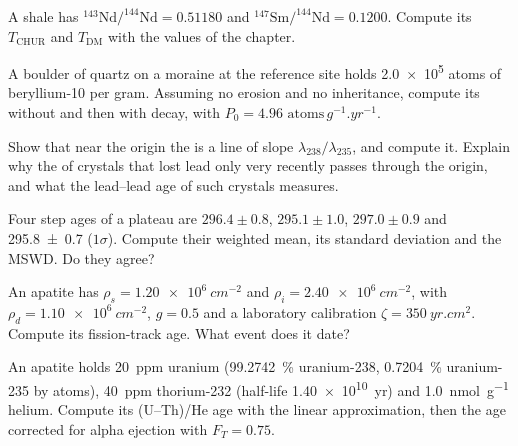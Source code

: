 \begin{exercise}[$\star$]\label{exo:b3:advanced-geochronology:3}
A shale has $^{143}\mathrm{Nd}/^{144}\mathrm{Nd} = 0.51180$ and
$^{147}\mathrm{Sm}/^{144}\mathrm{Nd} = 0.1200$. Compute its $T_{\mathrm{CHUR}}$
and $T_{\mathrm{DM}}$ with the values of the chapter.
\end{exercise}

\begin{exercise}[$\star$]\label{exo:b3:advanced-geochronology:4}
A boulder of quartz on a moraine at the reference site holds \num{2.0e5}
atoms of beryllium-10 per gram. Assuming no erosion and no inheritance,
compute its  without and then with decay, with $P_0 =
\num{4.96}\text{ atoms}\,\unit{g^{-1}.yr^{-1}}$.
\end{exercise}

\begin{exercise}[$\star\star$]\label{exo:b3:advanced-geochronology:5}
Show that near the origin the  is a line of slope
$\lambda_{238}/\lambda_{235}$, and compute it. Explain why the  of
crystals that lost lead only very recently passes through the origin, and
what the lead--lead age of such crystals measures.
\end{exercise}

\begin{exercise}[$\star\star$]\label{exo:b3:advanced-geochronology:6}
Four step ages of a plateau are $296.4 \pm 0.8$, $295.1 \pm 1.0$, $297.0 \pm
0.9$ and \qty[separate-uncertainty=true]{295.8 \pm 0.7}{\Ma} ($1\sigma$). Compute their weighted mean,
its standard deviation and the MSWD. Do they agree?
\end{exercise}

\begin{exercise}[$\star\star$]\label{exo:b3:advanced-geochronology:7}
An apatite has $\rho_s = \qty{1.20e6}{cm^{-2}}$ and $\rho_i =
\qty{2.40e6}{cm^{-2}}$, with $\rho_d = \qty{1.10e6}{cm^{-2}}$, $g = 0.5$ and a
laboratory calibration $\zeta = \qty{350}{yr.cm^2}$. Compute its fission-track
age. What event does it date?
\end{exercise}

\begin{exercise}[$\star\star$]\label{exo:b3:advanced-geochronology:8}
An apatite holds \qty{20}{ppm} uranium (\qty{99.2742}{\percent}
uranium-238, \qty{0.7204}{\percent} uranium-235 by atoms), \qty{40}{ppm}
thorium-232 (half-life \qty{1.40e10}{yr}) and \qty{1.0}{nmol.g^{-1}} helium.
Compute its (U--Th)/He age with the linear approximation, then the age
corrected for alpha ejection with $F_T = 0.75$.
\end{exercise}

